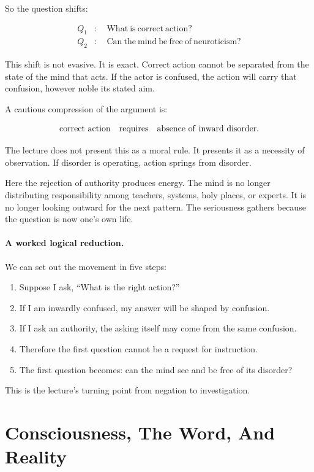 So the question shifts:

\begin{align}
Q_1 &: \quad \mathrm{What\ is\ correct\ action?}\\
Q_2 &: \quad \mathrm{Can\ the\ mind\ be\ free\ of\ neuroticism?}
\end{align}

This shift is not evasive. It is exact. Correct action cannot be separated from the state of the mind that acts. If the actor is confused, the action will carry that confusion, however noble its stated aim.

A cautious compression of the argument is:

\begin{equation}
\mathrm{correct\ action}
\quad\hbox{requires}\quad
\mathrm{absence\ of\ inward\ disorder}.
\end{equation}

The lecture does not present this as a moral rule. It presents it as a necessity of observation. If disorder is operating, action springs from disorder.

Here the rejection of authority produces energy. The mind is no longer distributing responsibility among teachers, systems, holy places, or experts. It is no longer looking outward for the next pattern. The seriousness gathers because the question is now one's own life.

\paragraph{A worked logical reduction.}
We can set out the movement in five steps:

\begin{enumerate}
\item Suppose I ask, ``What is the right action?''
\item If I am inwardly confused, my answer will be shaped by confusion.
\item If I ask an authority, the asking itself may come from the same confusion.
\item Therefore the first question cannot be a request for instruction.
\item The first question becomes: can the mind see and be free of its disorder?
\end{enumerate}

This is the lecture's turning point from negation to investigation.

\section{Consciousness, The Word, And Reality}

